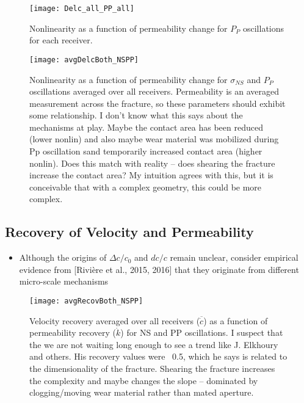 \documentclass[letterpaper,10pt]{article}
\begin{document}
\newpage

\begin{figure}[ht]
	\centering
	\texttt{[image: Delc\_all\_PP\_all]}
	\caption{Nonlinearity as a function of permeability change for $ P_P $ oscillations for each receiver.}
	\label{fig:delc_plots2}
\end{figure}

\newpage

\begin{figure}[ht]
	\centering
	\texttt{[image: avgDelcBoth\_NSPP]}
	\caption{Nonlinearity as a function of permeability change for $ \sigma_{NS} $ and $ P_P $ oscillations averaged over all receivers. Permeability is an averaged measurement across the fracture, so these parameters should exhibit some relationship. I don’t know what this says about the mechanisms at play. Maybe the contact area has been reduced (lower nonlin) and also maybe wear material was mobilized during Pp oscillation sand temporarily increased contact area (higher nonlin). Does this match with reality -- does shearing the fracture increase the contact area? My intuition agrees with this, but it is conceivable that with a complex geometry, this could be more complex.}
	\label{fig:delc_plots2}
\end{figure}

\newpage

\subsection{Recovery of Velocity and Permeability}
\begin{itemize}
	\item Although the origins of $ \Delta c/c_0 $ and $ dc/c $ remain unclear, consider empirical evidence from [Rivière et al., 2015, 2016] that they originate from different micro-scale mechanisms 
\end{itemize}


\begin{figure}[ht]
	\centering
	\texttt{[image: avgRecovBoth\_NSPP]}
	\caption{Velocity recovery averaged over all receivers ($ \overline {\dot c} $) as a function of permeability recovery ($ \dot k $) for NS and PP oscillations. 
	I suspect that the we are not waiting long enough to see a trend like J. Elkhoury and others. His recovery values were ~0.5, which he says is related to the dimensionality of the fracture. Shearing the fracture increases the complexity and maybe changes the slope -- dominated by clogging/moving wear material rather than mated aperture.}
	\label{fig:delc_plots2}
\end{figure}
\end{document}
